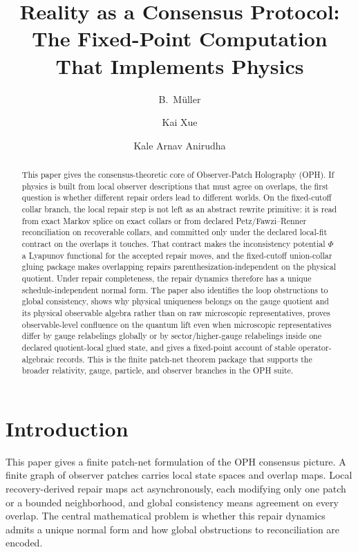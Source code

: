 \documentclass[11pt]{article}
\title{Reality as a Consensus Protocol:\\
The Fixed-Point Computation That Implements Physics}
\author{B.\ M\"uller \and Kai Xue \and Kale Arnav Anirudha}
\date{\OPHPaperReleaseDate}
\theoremstyle{remark}
\theoremstyle{plain}
\begin{document}
\maketitle
\OPHPaperReleaseBanner

\begin{abstract}
This paper gives the consensus-theoretic core of Observer-Patch Holography (OPH). If physics is built from local observer descriptions that must agree on overlaps, the first question is whether different repair orders lead to different worlds. On the fixed-cutoff collar branch, the local repair step is not left as an abstract rewrite primitive: it is read from exact Markov splice on exact collars or from declared Petz/Fawzi--Renner reconciliation on recoverable collars, and committed only under the declared local-fit contract on the overlaps it touches. That contract makes the inconsistency potential \(\Phi\) a Lyapunov functional for the accepted repair moves, and the fixed-cutoff union-collar gluing package makes overlapping repairs parenthesization-independent on the physical quotient. Under repair completeness, the repair dynamics therefore has a unique schedule-independent normal form. The paper also identifies the loop obstructions to global consistency, shows why physical uniqueness belongs on the gauge quotient and its physical observable algebra rather than on raw microscopic representatives, proves observable-level confluence on the quantum lift even when microscopic representatives differ by gauge relabelings globally or by sector/higher-gauge relabelings inside one declared quotient-local glued state, and gives a fixed-point account of stable operator-algebraic records. This is the finite patch-net theorem package that supports the broader relativity, gauge, particle, and observer branches in the OPH suite.
\end{abstract}

\section{Introduction}

This paper gives a finite patch-net formulation of the OPH consensus picture. A finite graph of
observer patches carries local state spaces and overlap maps. Local recovery-derived repair maps act
asynchronously, each modifying only one patch or a bounded neighborhood, and global consistency
means agreement on every overlap. The central mathematical problem is whether this repair dynamics
admits a unique normal form and how global obstructions to reconciliation are encoded.
\end{document}
